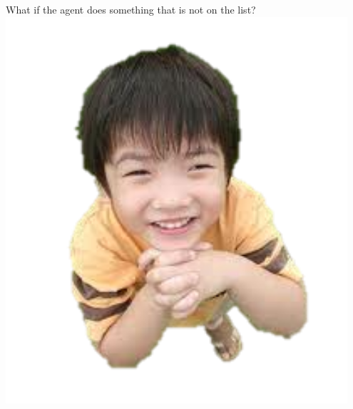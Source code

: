 \begin{frame}
    \begin{columns}[c]
            \Large{What if the agent does something that is not on the list?}
        \column{0.5\textheight}
            \centering
            \includegraphics[width=0.95\textwidth]{img/kid-question.png} \\
    \end{columns}
\end{frame}

